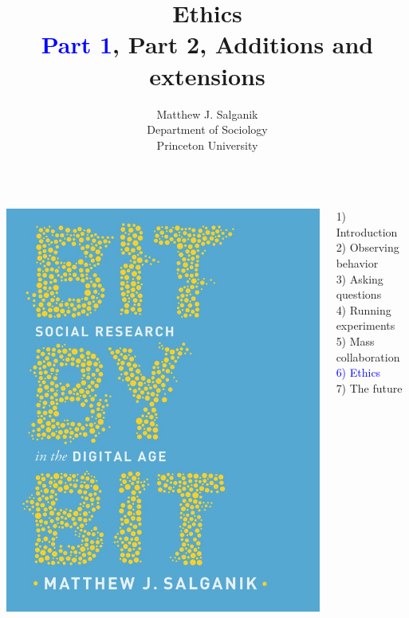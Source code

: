 \documentclass{beamer}
\title[]{Ethics\\\textcolor{blue}{Part 1}, Part 2, Additions and extensions}
\author[]{Matthew J. Salganik\\Department of Sociology\\Princeton University}
\date[]{Summer Institutes in Computational Social Science\\Day 1\\2020
\vfill
\begin{flushleft}
{\scriptsize
The Summer Institutes in Computational Social Science is supported by grants from the Russell Sage Foundation, Alfred P. Sloan Foundation, Facebook, and the Social Science Research Council.}
\end{flushleft}
\begin{flushright}
\texttt{[image: figures/cc-by.png]}
\end{flushright}
}
\begin{document}
\frame{\titlepage}
\begin{frame}

\begin{columns}
\begin{column}{.40\textwidth}
\includegraphics[width=\textwidth]{figures/salganik_bit_2018_cover}
\end{column}%

\hfill%

\begin{column}{.60\textwidth}
1) Introduction \\
2) Observing behavior \\
3) Asking questions \\
4) Running experiments \\
5) Mass collaboration \\
\textcolor{blue}{6) Ethics} \\
7) The future \\
\end{column}%
\end{columns}


\end{frame}
\end{document}
